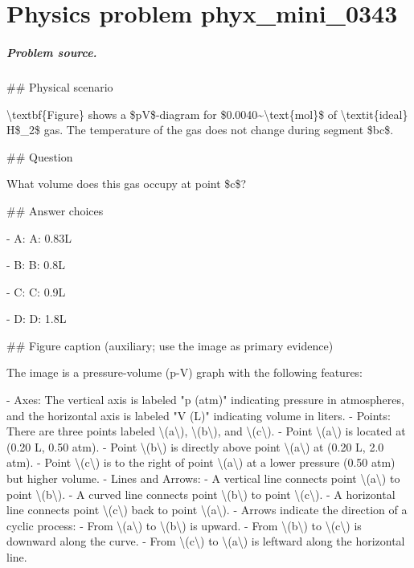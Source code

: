 
\chapter{Physics problem phyx\_mini\_0343}
\label{ch:PhyXMiniProblems_problem_phyx_mini_0343}

\paragraph{Problem source.}
\#\# Physical scenario

\textbackslash{}textbf\{Figure\} shows a \$pV\$-diagram for \$0.0040\textasciitilde{}\textbackslash{}text\{mol\}\$ of \textbackslash{}textit\{ideal\} H\$\_2\$ gas. The temperature of the gas does not change during segment \$bc\$.

\#\# Question

What volume does this gas occupy at point \$c\$?

\#\# Answer choices

- A: A: 0.83L

- B: B: 0.8L

- C: C: 0.9L

- D: D: 1.8L

\#\# Figure caption (auxiliary; use the image as primary evidence)

The image is a pressure-volume (p-V) graph with the following features:

- Axes: The vertical axis is labeled "p (atm)" indicating pressure in atmospheres, and the horizontal axis is labeled "V (L)" indicating volume in liters.
- Points: There are three points labeled \textbackslash{}(a\textbackslash{}), \textbackslash{}(b\textbackslash{}), and \textbackslash{}(c\textbackslash{}).
  - Point \textbackslash{}(a\textbackslash{}) is located at (0.20 L, 0.50 atm).
  - Point \textbackslash{}(b\textbackslash{}) is directly above point \textbackslash{}(a\textbackslash{}) at (0.20 L, 2.0 atm).
  - Point \textbackslash{}(c\textbackslash{}) is to the right of point \textbackslash{}(a\textbackslash{}) at a lower pressure (0.50 atm) but higher volume.
- Lines and Arrows: 
  - A vertical line connects point \textbackslash{}(a\textbackslash{}) to point \textbackslash{}(b\textbackslash{}).
  - A curved line connects point \textbackslash{}(b\textbackslash{}) to point \textbackslash{}(c\textbackslash{}).
  - A horizontal line connects point \textbackslash{}(c\textbackslash{}) back to point \textbackslash{}(a\textbackslash{}).
- Arrows indicate the direction of a cyclic process:
  - From \textbackslash{}(a\textbackslash{}) to \textbackslash{}(b\textbackslash{}) is upward.
  - From \textbackslash{}(b\textbackslash{}) to \textbackslash{}(c\textbackslash{}) is downward along the curve.
  - From \textbackslash{}(c\textbackslash{}) to \textbackslash{}(a\textbackslash{}) is leftward along the horizontal line.

